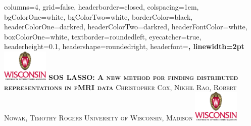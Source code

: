 \documentclass[landscape,a0paper,fontscale=0.3]{baposter}
\begin{document}
\begin{poster}
{
columns=4,
grid=false,
headerborder=closed, %
colspacing=1em, %
bgColorOne=white, %
bgColorTwo=white, %
borderColor=black, %
headerColorOne=darkred, %
headerColorTwo=darkred, %
headerFontColor=white, %
boxColorOne=white, %
textborder=roundedleft, %
eyecatcher=true, %
headerheight=0.1\textheight, %
headershape=roundedright, %
headerfont=\Large\bf, %
linewidth=2pt %
}
%
{\includegraphics[height=4em]{UWlogo_warm.eps}} %
{\bf\textsc{SOS LASSO: A new method for finding distributed representations in fMRI data}\vspace{0.5em}} %
{\textsc{Christopher Cox, Nikhil Rao, Robert Nowak, Timothy Rogers \hspace{12pt} University of Wisconsin, Madison}} %
{\includegraphics[height=4em]{UWlogo_warm.eps}} %



\end{poster}
\end{document}

